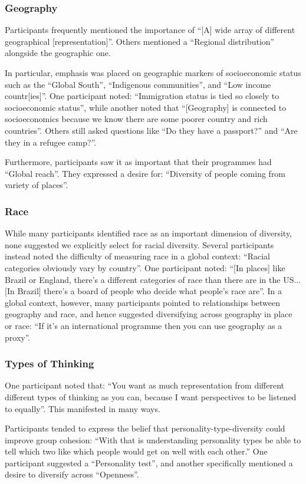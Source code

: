 \subsubsection{Geography}
Participants frequently mentioned the importance of ``[A] wide array of different geographical [representation]''. Others mentioned a ``Regional distribution'' alongside the geographic one.

In particular, emphasis was placed on geographic markers of socioeconomic status such as  the ``Global South'', ``Indigenous communities'', and ``Low income countr[ies]''. One participant noted: ``Immigration status is tied so closely to socioeconomic status'', while another noted that ``[Geography] is connected to socioeconomics because we know there are some poorer country and rich countries''. Others still asked questions like ``Do they have a passport?'' and ``Are they in a refugee camp?''.

Furthermore, participants saw it as important that their programmes had ``Global reach''. They expressed a desire for: ``Diversity of people coming from variety of places''.

\subsubsection{Race}
While many participants identified race as an important dimension of diversity, none suggested we explicitly select for racial diversity. Several participants instead noted the difficulty of measuring race in a global context: ``Racial categories obviously vary by country''. One participant noted: ``[In places] like Brazil or England, there's a different categories of race than there are in the US...[In Brazil] there's a board of people who decide what people's race are''. In a global context, however, many participants pointed to relationships between geography and race, and hence suggested diversifying across geography in place or race: ``If it's an international programme then you can use geography as a proxy''.

\subsubsection{Types of Thinking}
One participant noted that: ``You want as much representation from different different types of thinking as you can, because I want perspectives to be listened to equally''. This manifested in many ways.

Participants tended to express the belief that personality-type-diversity could improve group cohesion: ``With that is understanding personality types be able to tell which two like which people would get on well with each other.'' One participant suggested a ``Personality test'', and another specifically mentioned a desire to diversify across ``Openness''.

